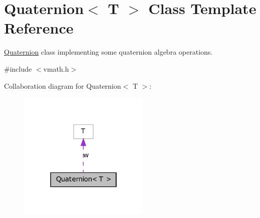 \hypertarget{class_quaternion}{
\section{Quaternion$<$ T $>$ Class Template Reference}
\label{class_quaternion}
}


\hyperlink{class_quaternion}{Quaternion} class implementing some quaternion algebra operations.  




{\ttfamily \#include $<$vmath.h$>$}



Collaboration diagram for Quaternion$<$ T $>$:\nopagebreak
\begin{figure}[H]
\begin{center}
\leavevmode
\includegraphics[width=178pt]{class_quaternion__coll__graph}
\end{center}
\end{figure}
